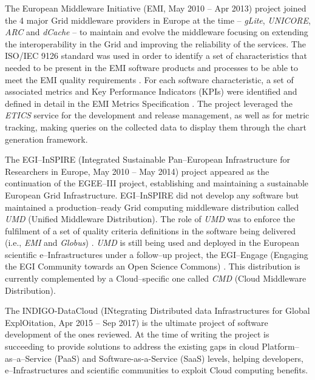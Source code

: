 \documentclass[journal]{IEEEtran}
\begin{document}
The European Middleware Initiative (EMI, May 2010 -- Apr 2013)
\cite{cordis:emi} project joined the 4 major Grid middleware providers in
Europe at the time -- {\sl gLite}, {\sl UNICORE}, {\sl ARC} and {\sl dCache} --
to maintain and evolve the middleware focusing on extending the
interoperability in the Grid and improving the reliability of the services. The
ISO/IEC 9126 \cite{iso-9126} standard was used in order to identify a set of
characteristics that needed to be present in the EMI software products and
processes to be able to meet the EMI quality requirements
\cite{emi-quality-model}. For each software characteristic, a set of associated
metrics and Key Performance Indicators (KPIs) were identified and defined in
detail in the EMI Metrics Specification \cite{emi-metrics}. The project
leveraged the {\sl ETICS} service for the development and release management,
as well as for metric tracking, making queries on the collected data to display
them through the chart generation framework.

The EGI--InSPIRE (Integrated Sustainable Pan--European Infrastructure for
Researchers in Europe, May 2010 -- May 2014) project \cite{cordis:egi-inspire}
appeared as the continuation of the EGEE--III project, establishing and
maintaining a sustainable European Grid Infrastructure. EGI--InSPIRE did not
develop any software but maintained a production--ready Grid computing
middleware distribution called {\sl UMD} (Unified Middleware Distribution).
The role of {\sl UMD} was to enforce the fulfilment of a set of quality
criteria definitions \cite{egi-qc} in the software being delivered (i.e.,
{\sl EMI} and {\sl Globus}) \cite{mario}. {\sl UMD} is still being used and
deployed in the European scientific e--Infrastructures under a follow--up
project, the EGI--Engage (Engaging the EGI Community towards an Open Science
Commons) \cite{cordis:egi-engage}. This distribution is currently complemented
by a Cloud--specific one called {\sl CMD} (Cloud Middleware Distribution).

The INDIGO-DataCloud (INtegrating Distributed data Infrastructures for Global
ExplOitation, Apr 2015 -- Sep 2017) \cite{cordis:indigo} is the ultimate
project of software development of the ones reviewed. At the time of writing
the project is succeeding to provide solutions to address the existing gaps in
cloud Platform--as--a--Service (PaaS) and Software-as-a-Service (SaaS) levels,
helping developers, e--Infrastructures and scientific communities to exploit
Cloud computing benefits.
\end{document}
